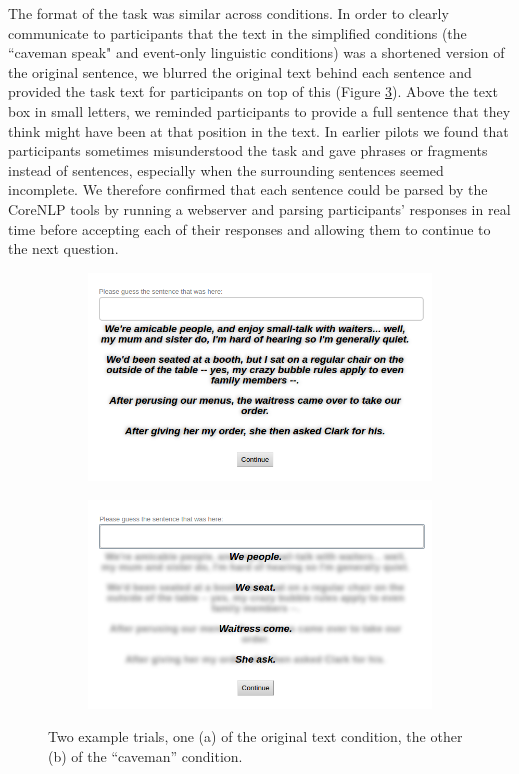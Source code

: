 \documentclass[10pt,a4paper]{article}
\begin{document}
The format of the task was similar across conditions.
In order to clearly communicate to participants that the text in the simplified conditions (the ``caveman speak" and event-only linguistic conditions) was a shortened version of the original sentence, we blurred the original text behind each sentence and provided the task text for participants on top of this (Figure \ref{fig:trial}).
Above the text box in small letters, we reminded participants to provide a full sentence that they think might have been at that position in the text.
In earlier pilots we found that participants sometimes misunderstood the task and gave phrases or fragments instead of sentences, especially when the surrounding sentences seemed incomplete.
We therefore confirmed that each sentence could be parsed by the CoreNLP tools \cite{corenlp} by running a webserver and parsing participants' responses in real time before accepting each of their responses and allowing them to continue to the next question.

\begin{figure}
 \centering
 \begin{subfigure}{0.4\paperwidth}
  \centering
  \includegraphics[width=0.35\paperwidth]{images/trial-full-text.png}
  \caption{}
  \label{fig:trial-full-text}
 \end{subfigure}
 \begin{subfigure}{0.4\paperwidth}
  \centering
  \includegraphics[width=0.35\paperwidth]{images/trial-caveman.png}
  \caption{}
  \label{fig:trial-caveman}
 \end{subfigure}
 \caption{Two example trials, one (a) of the original text condition, the other (b) of the ``caveman'' condition.}
 \label{fig:trial}
\end{figure}
\end{document}
